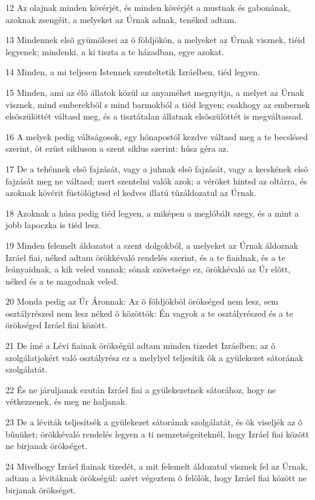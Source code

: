 \par 12 Az olajnak minden kövérjét, és minden kövérjét a mustnak és gabonának, azoknak zsengéit, a melyeket az Úrnak adnak, tenéked adtam.
\par 13 Mindennek elsõ gyümölcsei az õ földjökön, a melyeket az Úrnak visznek, tiéid legyenek; mindenki, a ki tiszta a te házadban, egye azokat.
\par 14 Minden, a mi teljesen Istennek szenteltetik Izráelben, tiéd legyen.
\par 15 Minden, ami az élõ állatok közül az anyaméhet megnyitja, a melyet az Úrnak visznek, mind emberekbõl s mind barmokból a tiéd legyen; csakhogy az embernek elsõszülöttét váltasd meg, és a tisztátalan állatnak elsõszülöttét is megváltassad.
\par 16 A melyek pedig váltságosok, egy hónapostól kezdve váltasd meg a te becslésed szerint, öt ezüst sikluson a szent siklus szerint:  húsz géra az.
\par 17 De a tehénnek elsõ fajzását, vagy a juhnak elsõ fajzását, vagy a kecskének elsõ fajzását meg ne váltasd; mert szentelni valók azok; a véröket hintsd az oltárra, és azoknak kövérit füstölögtesd el kedves illatú tûzáldozatul az Úrnak.
\par 18 Azoknak a húsa pedig tiéd legyen, a miképen a meglóbált szegy, és a mint a jobb lapoczka is tiéd lesz.
\par 19 Minden felemelt áldozatot a szent dolgokból, a melyeket az Úrnak áldoznak Izráel fiai, néked adtam örökkévaló rendelés szerint, és a te fiaidnak, és a te leányaidnak, a kik veled vannak; sónak szövetsége ez, örökkévaló az Úr elõtt, néked és a te magodnak veled.
\par 20 Monda pedig az Úr Áronnak: Az õ földjökbõl örökséged nem lesz, sem osztályrészed nem lesz néked õ közöttök: Én vagyok a te osztályrészed és a te örökséged Izráel fiai között.
\par 21 De ímé a Lévi fiainak örökségül adtam minden tizedet Izráelben; az õ szolgálatjokért való osztályrész ez a melylyel teljesítik õk a gyülekezet sátorának szolgálatát.
\par 22 És ne járuljanak ezután Izráel fiai a gyülekezetnek sátorához, hogy ne vétkezzenek, és meg ne haljanak.
\par 23 De a léviták teljesítsék a gyülekezet sátorának szolgálatát, és õk viseljék az õ bûnüket; örökkévaló rendelés legyen a ti nemzetségeiteknél, hogy Izráel fiai között ne birjanak örökséget.
\par 24 Mivelhogy Izráel fiainak tizedét, a mit felemelt áldozatul visznek fel az Úrnak, adtam a lévitáknak örökségül: azért végeztem õ felõlök, hogy Izráel fiai között ne birjanak örökséget.
